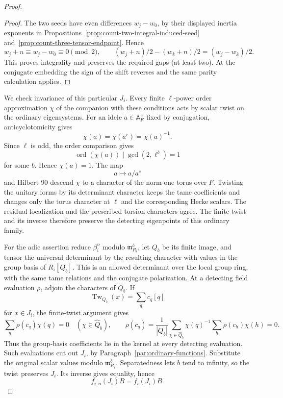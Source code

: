 \begin{proof}
\begin{proof}
The two seeds have even differences \(w_j-w_0\), by their displayed
inertia exponents in Propositions~\ref{prop:count-two-integral-induced-seed}
and~\ref{prop:count-three-tensor-endpoint}. Hence
\[
          w_j+n\equiv w_j-w_0\equiv0\pmod2,\qquad
          (w_j+n)/2-(w_k+n)/2=(w_j-w_k)/2 .
\]
This proves integrality and preserves the required gaps (at least
two). At the conjugate embedding the sign of the shift reverses
and the same parity calculation applies.
\end{proof}


We check invariance of this particular \(J_i\).
Every finite \(\ell\)-power order approximation \(\chi\)
of the companion with these conditions acts by scalar
twist on the ordinary eigensystems. For an idele \(a\in\mathbb A_F^\times\) fixed by conjugation, anticyclotomicity gives
\[
 \chi(a)=\chi(a^c)=\chi(a)^{-1}.
\]
Since \(\ell\) is odd, the order comparison gives
\[
 \operatorname{ord}(\chi(a))\mid\gcd(2,\ell^b)=1
\]
for some \(b\). Hence \(\chi(a)=1\). The map
\[
 a\mapsto a/a^c
\]
and Hilbert 90 descend
\(\chi\) to a character of the norm-one torus over \(F\).
Twisting the unitary forms by its determinant character
keeps the tame coefficients and changes only the torus
character at \(\ell\) and the corresponding Hecke scalars.
The residual localization and the prescribed torsion
characters agree. The finite twist and its inverse therefore
preserve the detecting eigenpoints of this ordinary family.

For the adic assertion reduce \(\beta_i^n\) modulo
\(\mathfrak m_{R_i}^b\), let \(Q_b\) be its finite image,
and tensor the universal determinant by the resulting
character with values in the group basis of \(R_i[Q_b]\).
This is an allowed determinant over the local group ring,
with the same tame relations and the conjugate polarization.
At a detecting field evaluation \(\rho\), adjoin the
characters of \(Q_b\). If
\[
 \operatorname{Tw}_{Q_b}(x)=\sum_q c_q[q]
\]
for \(x\in J_i\),
the finite-twist argument gives
\[
 \sum_q \rho(c_q)\chi(q)=0\quad(\chi\in\widehat Q_b),
 \qquad
 \rho(c_q)=\frac1{|Q_b|}\sum_{\chi\in\widehat Q_b}\chi(q)^{-1}
                             \sum_h\rho(c_h)\chi(h)=0 .
\]
Thus the group-basis coefficients lie in the kernel at
every detecting evaluation.
Such evaluations cut out \(J_i\), by
Paragraph~\ref{par:ordinary-functions}.
Substitute the original scalar values modulo
\(\mathfrak m_{R_i}^b\). Separatedness lets \(b\) tend to
infinity, so the twist preserves \(J_i\). Its inverse
gives equality, hence
\[
                         f_{i,n}(J_i)B=f_i(J_i)B.
\]


\end{proof}
